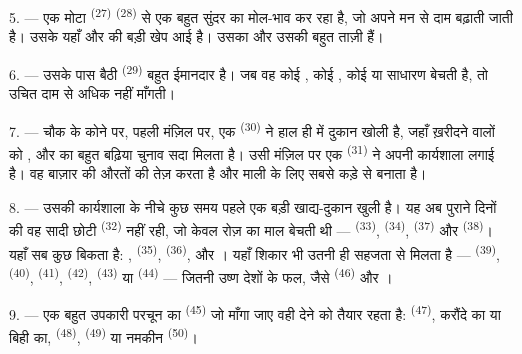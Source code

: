 5. --- एक मोटा  \textsuperscript{(27)} 
\textsuperscript{(28)} से एक बहुत सुंदर  का मोल-भाव कर रहा है, जो
अपने मन से दाम बढ़ाती जाती है। उसके यहाँ  और
 की बड़ी खेप आई है। उसका  और उसकी 
बहुत ताज़ी हैं।

\VUsaut{4.0mm}
\VUsaut{3.0mm}

6. --- उसके पास बैठी  \textsuperscript{(29)} बहुत
ईमानदार है। जब वह कोई , कोई , कोई  या
साधारण  बेचती है, तो उचित दाम से अधिक नहीं माँगती।

7. --- चौक के कोने पर, पहली मंज़िल पर, एक 
\textsuperscript{(30)} ने हाल ही में दुकान खोली है, जहाँ ख़रीदने वालों को
,  और  का बहुत बढ़िया
चुनाव सदा मिलता है। उसी मंज़िल पर एक 
\textsuperscript{(31)} ने अपनी कार्यशाला लगाई है। वह बाज़ार की औरतों की
 तेज़ करता है और माली के लिए सबसे कड़े  से
 बनाता है।

\VUsaut{4.0mm}
\VUsaut{3.0mm}

8. --- उसकी कार्यशाला के नीचे कुछ समय पहले एक बड़ी खाद्य-दुकान खुली है। यह अब
पुराने दिनों की वह सादी छोटी  \textsuperscript{(32)} नहीं
रही, जो केवल रोज़ का माल बेचती थी —  \textsuperscript{(33)},
 \textsuperscript{(34)},  \textsuperscript{(37)}
और  \textsuperscript{(38)}। यहाँ सब कुछ बिकता है:
,  \textsuperscript{(35)},
 \textsuperscript{(36)},  और
। यहाँ शिकार भी उतनी ही सहजता से मिलता है —
 \textsuperscript{(39)},  \textsuperscript{(40)},
 \textsuperscript{(41)},  \textsuperscript{(42)},
 \textsuperscript{(43)} या 
\textsuperscript{(44)} — जितनी उष्ण देशों के फल, जैसे 
\textsuperscript{(46)} और ।

9. --- एक बहुत उपकारी परचून का  \textsuperscript{(45)} जो माँगा
जाए वही देने को तैयार रहता है:  \textsuperscript{(47)}, करौंदे का
या बिही का,  \textsuperscript{(48)}, 
\textsuperscript{(49)} या नमकीन  \textsuperscript{(50)}।


